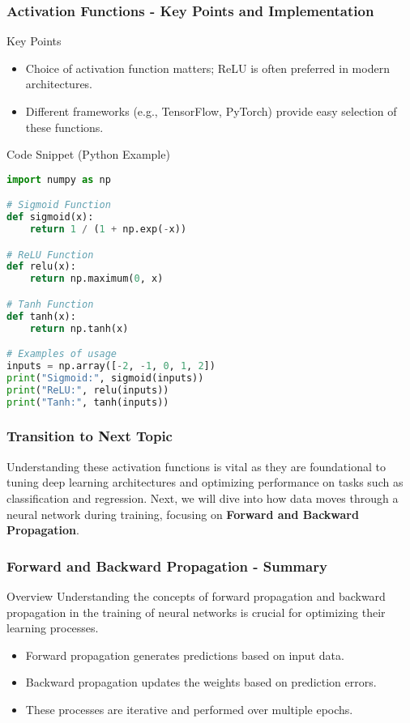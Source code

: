 \documentclass[aspectratio=169]{beamer}
\begin{document}
\begin{frame}[fragile]
    \frametitle{Activation Functions - Key Points and Implementation}
    \begin{block}{Key Points}
        \begin{itemize}
            \item Choice of activation function matters; ReLU is often preferred in modern architectures.
            \item Different frameworks (e.g., TensorFlow, PyTorch) provide easy selection of these functions.
        \end{itemize}
    \end{block}
    \begin{block}{Code Snippet (Python Example)}
        \begin{lstlisting}[language=Python]
import numpy as np

# Sigmoid Function
def sigmoid(x):
    return 1 / (1 + np.exp(-x))

# ReLU Function
def relu(x):
    return np.maximum(0, x)

# Tanh Function
def tanh(x):
    return np.tanh(x)

# Examples of usage
inputs = np.array([-2, -1, 0, 1, 2])
print("Sigmoid:", sigmoid(inputs))
print("ReLU:", relu(inputs))
print("Tanh:", tanh(inputs))
        \end{lstlisting}
    \end{block}
\end{frame}

\begin{frame}[fragile]
    \frametitle{Transition to Next Topic}
    Understanding these activation functions is vital as they are foundational to tuning deep learning architectures and optimizing performance on tasks such as classification and regression. Next, we will dive into how data moves through a neural network during training, focusing on \textbf{Forward and Backward Propagation}.
\end{frame}

\begin{frame}[fragile]
  \frametitle{Forward and Backward Propagation - Summary}
  \begin{block}{Overview}
    Understanding the concepts of forward propagation and backward propagation in the training of neural networks is crucial for optimizing their learning processes.
  \end{block}
  \begin{itemize}
    \item Forward propagation generates predictions based on input data.
    \item Backward propagation updates the weights based on prediction errors.
    \item These processes are iterative and performed over multiple epochs.
  \end{itemize}
\end{frame}
\end{document}

